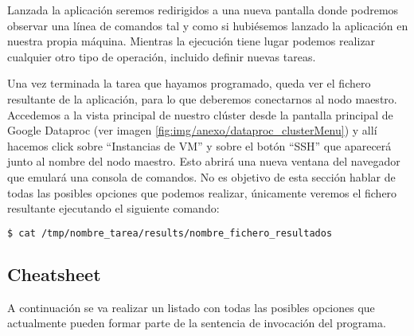 
Lanzada la aplicación seremos redirigidos a una nueva pantalla donde podremos observar una línea de comandos tal y como si hubiésemos  lanzado la aplicación en nuestra propia máquina. Mientras la ejecución tiene lugar podemos realizar cualquier otro tipo de operación, incluido definir nuevas tareas.

Una vez terminada la tarea que hayamos programado, queda ver el fichero resultante de la aplicación, para lo que deberemos conectarnos al nodo maestro. Accedemos a la vista principal de nuestro clúster desde la pantalla principal de Google Dataproc (ver imagen \ref{fig:img/anexo/dataproc_clusterMenu}) y allí hacemos click sobre ``Instancias de VM'' y sobre el botón ``SSH'' que aparecerá junto al nombre del nodo maestro.
Esto abrirá una nueva ventana del navegador que emulará una consola de comandos. No es objetivo de esta sección hablar de todas las posibles opciones que podemos realizar, únicamente veremos el fichero resultante ejecutando el siguiente comando:

\begin{lstlisting}[language=bash]
$ cat /tmp/nombre_tarea/results/nombre_fichero_resultados
\end{lstlisting}

\subsection{Cheatsheet}\label{subsec:cheatsheet}
A continuación se va realizar un listado con todas las posibles opciones que actualmente pueden formar parte de la sentencia de invocación del programa.

